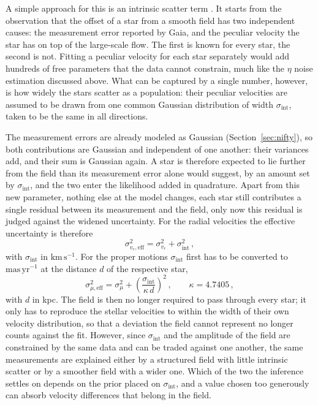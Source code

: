 A simple approach for this is an intrinsic scatter term \citep[Sect.~8]{Hogg2010}. It starts from
the observation that the offset of a star from a smooth field has two independent causes: the
measurement error reported by Gaia, and the peculiar velocity the star has on top of the
large-scale flow. The first is known for every star, the second is not. Fitting a peculiar velocity
for each star separately would add hundreds of free parameters that the data cannot constrain, much
like the $\eta$ noise estimation discussed above. What can be captured by a single number, however,
is how widely the stars scatter as a population: their peculiar velocities are assumed to be drawn
from one common Gaussian distribution of width $\sigma_\mathrm{int}$, taken to be the same in all
directions.

The measurement errors are already modeled as Gaussian (Section~\ref{sec:nifty}), so both
contributions are Gaussian and independent of one another: their variances add, and their sum is
Gaussian again. A star is therefore expected to lie further from the field than its
measurement error alone would suggest, by an amount set by $\sigma_\mathrm{int}$, and the two enter
the likelihood added in quadrature. Apart from this new parameter, nothing else at the model changes,
each star still contributes a single residual between its measurement and the field, only now this
residual is judged against the widened uncertainty. For the radial velocities the effective uncertainty
is therefore
\begin{equation}
    \sigma_{v_r,\mathrm{eff}}^2 = \sigma_{v_r}^2 + \sigma_\mathrm{int}^2 \, ,
    \label{eq:sigma_eff_rv}
\end{equation}
with $\sigma_\mathrm{int}$ in $\mathrm{km\,s^{-1}}$. For the proper motions $\sigma_\mathrm{int}$ first
has to be converted to $\mathrm{mas\,yr^{-1}}$ at the distance $d$ of the respective star,
\begin{equation}
    \sigma_{\mu,\mathrm{eff}}^2 = \sigma_{\mu}^2
    + \left( \frac{\sigma_\mathrm{int}}{\kappa\,d} \right)^{2} \, ,
    \qquad \kappa = 4.7405 \, ,
    \label{eq:sigma_eff_pm}
\end{equation}
with $d$ in kpc. The field is then no longer required to pass through every star; it only has to
reproduce the stellar velocities to within the width of their own velocity distribution, so that a
deviation the field cannot represent no longer counts against the fit. However, since $\sigma_\mathrm{int}$
and the amplitude of the field are constrained by the same data and can be traded against one another,
the same measurements are explained either by a structured field with little intrinsic scatter or by
a smoother field with a wider one. Which of the two the inference settles on depends on the prior
placed on $\sigma_\mathrm{int}$, and a value chosen too generously can absorb velocity differences
that belong in the field.

